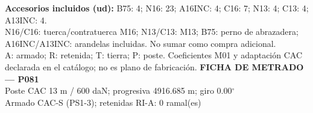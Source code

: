 \begingroup\scriptsize
\textbf{Accesorios incluidos (ud):} B75: 4; N16: 23; A16INC: 4; C16: 7; N13: 4; C13: 4; A13INC: 4.\\
N16/C16: tuerca/contratuerca M16; N13/C13: M13; B75: perno de abrazadera; A16INC/A13INC: arandelas incluidas. No sumar como compra adicional.\\
A: armado; R: retenida; T: tierra; P: poste. Coeficientes M01 y adaptación CAC declarada en el catálogo; no es plano de fabricación.
\endgroup\endgroup
\clearpage{}
\begingroup\small\setlength{\parskip}{3pt}\renewcommand{\arraystretch}{1.05}
\textbf{\large FICHA DE METRADO — P081}\\[4pt]
Poste CAC 13 m / 600 daN; progresiva 4916.685 m; giro 0.00\ensuremath{^\circ}\\
Armado CAC-S (PS1-3); retenidas RI-A: 0 ramal(es)\\
\begingroup\scriptsize
